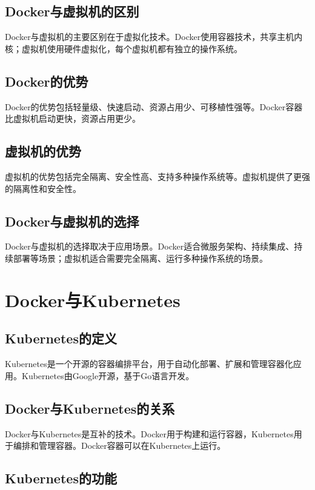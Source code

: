 \documentclass[12pt,UTF8]{ctexbook}
\begin{document}
\section{Docker与虚拟机的区别}

Docker与虚拟机的主要区别在于虚拟化技术。Docker使用容器技术，共享主机内核；虚拟机使用硬件虚拟化，每个虚拟机都有独立的操作系统。

\section{Docker的优势}

Docker的优势包括轻量级、快速启动、资源占用少、可移植性强等。Docker容器比虚拟机启动更快，资源占用更少。

\section{虚拟机的优势}

虚拟机的优势包括完全隔离、安全性高、支持多种操作系统等。虚拟机提供了更强的隔离性和安全性。

\section{Docker与虚拟机的选择}

Docker与虚拟机的选择取决于应用场景。Docker适合微服务架构、持续集成、持续部署等场景；虚拟机适合需要完全隔离、运行多种操作系统的场景。

\chapter{Docker与Kubernetes}

\section{Kubernetes的定义}

Kubernetes是一个开源的容器编排平台，用于自动化部署、扩展和管理容器化应用。Kubernetes由Google开源，基于Go语言开发。

\section{Docker与Kubernetes的关系}

Docker与Kubernetes是互补的技术。Docker用于构建和运行容器，Kubernetes用于编排和管理容器。Docker容器可以在Kubernetes上运行。

\section{Kubernetes的功能}
\end{document}
